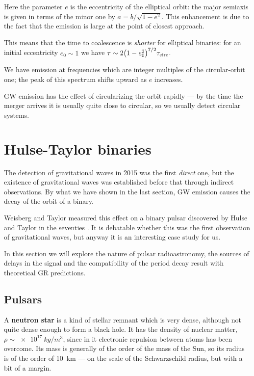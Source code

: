 \documentclass[main.tex]{subfiles}
\begin{document}
Here the parameter \(e\) is the eccentricity of the elliptical orbit: the major semiaxis is given in terms of the minor one by \(a = b / \sqrt{1 - e^2}\).
This enhancement is due to the fact that the emission is large at the point of closest approach. 

This means that the time to coalescence is \emph{shorter} for elliptical binaries: for an initial eccentricity \(e_0 \sim 1\) we have \(\tau \sim 2 \qty(1- e_0^2)^{7/2} \tau _{\text{circ}}\).

We have emission at frequencies which are integer multiples of the circular-orbit one; the peak of this spectrum shifts upward as \(e\) increases. 

GW emission has the effect of circularizing the orbit rapidly --- by the time the merger arrives it is usually quite close to circular, so we usually detect circular systems. 

\section{Hulse-Taylor binaries}

The detection of gravitational waves in 2015 \cite[]{ligoscientificcollaborationandvirgocollaborationObservationGravitationalWaves2016} was the first \emph{direct} one, but the existence of gravitational waves was established before that through indirect observations. 
By what we have shown in the last section, GW emission causes the decay of the orbit of a binary. 


Weisberg and Taylor measured this effect \cite[fig.\ 6 especially]{taylorNewTestGeneral1982} on a binary pulsar discovered by Hulse and Taylor in the seventies \cite[]{hulseDiscoveryPulsarBinary1975}.
It is debatable whether this was the first observation of gravitational waves, but anyway it is an interesting case study for us.

In this section we will explore the nature of pulsar radioastronomy, the sources of delays in the signal and the compatibility of the period decay result with theoretical GR predictions. 

\subsection{Pulsars}

A \textbf{neutron star} is a kind of stellar remnant which is very dense, although not quite dense enough to form a black hole. 
It has the density of nuclear matter, \(\rho \sim \SI{e17}{kg/m^3}\), since in it electronic repulsion between atoms has been overcome.
Its mass is generally of the order of the mass of the Sun, so its radius is of the order of \SI{10}{km} --- on the scale of the Schwarzschild radius, but with a bit of a margin.
\end{document}
